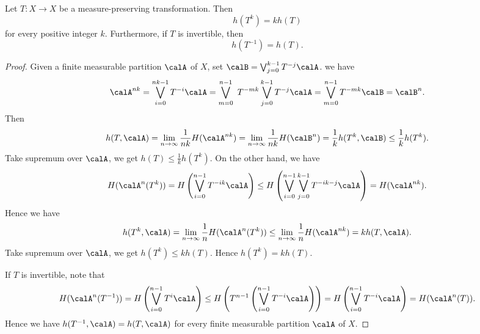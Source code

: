   \begin{proposition}
    Let $T: X \to X$ be a measure-preserving transformation.
    Then 
    \[ h(T^k) = k h(T) \]
    for every positive integer $k$.
    Furthermore, if $T$ is invertible, then 
    \[ h(T^{-1}) = h(T). \]
  \end{proposition}
  \begin{proof}
    Given a finite measurable partition $\calA$ of $X$, set $\calB = \bigvee_{j=0}^{k-1} T^{-j} \calA$.
    we have
    \[ \calA^{nk} = \bigvee_{i=0}^{nk-1} T^{-i} \calA = \bigvee_{m=0}^{n-1} \ T^{-m k} \bigvee_{j=0}^{k-1}  T^{-j} \calA = \bigvee_{m=0}^{n-1} T^{-m k} \calB = \calB^n. \]
    Then 
    \[ h(T, \calA) = \lim_{n \to \infty} \frac{1}{nk} H(\calA^{nk}) = \lim_{n \to \infty} \frac{1}{nk} H(\calB^n) = \frac{1}{k} h(T^k, \calB) \leq \frac{1}{k} h(T^k). \]
    Take supremum over $\calA$, we get $h(T) \leq \frac{1}{k} h(T^k)$.
    On the other hand, we have 
    \[ H(\calA^n(T^k)) = H\left(\bigvee_{i=0}^{n-1} T^{-i k} \calA\right) \leq H\left(\bigvee_{i=0}^{n-1} \bigvee_{j=0}^{k-1} T^{-i k - j} \calA\right) = H(\calA^{nk}). \]
    Hence we have
    \[ h(T^k, \calA) = \lim_{n \to \infty} \frac{1}{n} H(\calA^n(T^k)) \leq \lim_{n \to \infty} \frac{1}{n} H(\calA^{nk}) = k h(T, \calA). \]
    Take supremum over $\calA$, we get $h(T^k) \leq k h(T)$.
    Hence $h(T^k) = k h(T)$.

    If $T$ is invertible, note that
    \[ H(\calA^n(T^{-1})) = H\left(\bigvee_{i=0}^{n-1} T^{i} \calA\right) \leq H\left(T^{n-1} \left(\bigvee_{i=0}^{n-1} T^{-i} \calA\right) \right)= H\left(\bigvee_{i=0}^{n-1} T^{-i} \calA\right) = H(\calA^n(T)). \]
    Hence we have $h(T^{-1}, \calA) = h(T, \calA)$ for every finite measurable partition $\calA$ of $X$.
  \end{proof}

